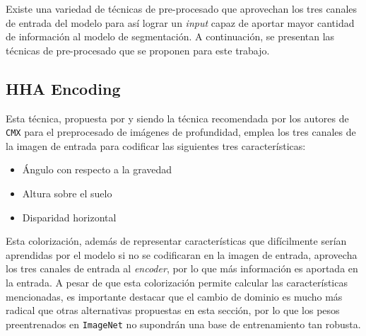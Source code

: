 \documentclass[12pt,a4paper]{report}
\begin{document}
Existe una variedad de técnicas de pre-procesado que aprovechan los tres canales de entrada del modelo para así lograr un \textit{input} capaz de aportar mayor cantidad de información al modelo de segmentación. A continuación, se presentan las técnicas de pre-procesado que se proponen para este trabajo.

\subsection{HHA Encoding}
\label{subsec:hha_encoding}
Esta técnica, propuesta por \cite{gupta2014learningrichfeaturesrgbd} y siendo la técnica recomendada por los autores de \texttt{CMX} para el preprocesado de imágenes de profundidad, emplea los tres canales de la imagen de entrada para codificar las siguientes tres características:
\begin{itemize}
    \item Ángulo con respecto a la gravedad
    \item Altura sobre el suelo
    \item Disparidad horizontal
\end{itemize}
Esta colorización, además de representar características que difícilmente serían aprendidas por el modelo si no se codificaran en la imagen de entrada, aprovecha los tres canales de entrada al \textit{encoder}, por lo que más información es aportada en la entrada. A pesar de que esta colorización permite calcular las características mencionadas, es importante destacar que el cambio de dominio es mucho más radical que otras alternativas propuestas en esta sección, por lo que los pesos preentrenados en \texttt{ImageNet} no supondrán una base de entrenamiento tan robusta.
\end{document}
